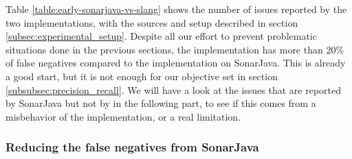 Table \ref{table:early-sonarjava-vs-slang} shows the number of issues reported by the two implementations, with the sources and setup described in section \ref{subsec:experimental_setup}. 
Despite all our effort to prevent problematic situations done in the previous sections, the implementation has more than 20\% of false negatives compared to the implementation on SonarJava. 
This is already a good start, but it is not enough for our objective set in section \ref{subsubsec:precision_recall}.
We will have a look at the issues that are reported by SonarJava but not by \slang{} in the following part, to see if this comes from a misbehavior of the implementation, or a real limitation.

\subsubsection{Reducing the false negatives from SonarJava}
\label{subsec:reducing_false_positive_sonarjava}

